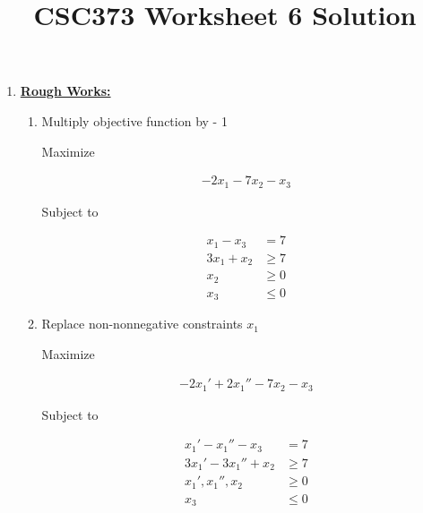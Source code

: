 \documentclass[12pt]{article}
\begin{document}
\title{CSC373 Worksheet 6 Solution}
\maketitle

\bigskip

\begin{enumerate}[1.]
    \item

    \bigskip

    \underline{\textbf{Rough Works:}}

    \begin{enumerate}[1.]
        \item Multiply objective function by - 1

        \bigskip

        \begin{mdframed}

        Maximize

        \begin{align*}
            -2x_1 - 7x_2 - x_3
        \end{align*}

        Subject to

        \begin{align*}
            x_1 - x_3  &= 7\\
            3x_1 + x_2 &\geq 7\\
            x_2 &\geq 0\\
            x_3 &\leq 0
        \end{align*}

        \end{mdframed}

        \item Replace non-nonnegative constraints $x_1$

        \begin{mdframed}

        Maximize

        \begin{align*}
            -2x_1' + 2x_1'' - 7x_2 - x_3
        \end{align*}

        Subject to

        \begin{align*}
            x_1' - x_1'' - x_3  &= 7\\
            3x_1' - 3x_1'' + x_2 &\geq 7\\
            x_1', x_1'', x_2 &\geq 0\\
            x_3 &\leq 0
        \end{align*}


\end{mdframed}
\end{enumerate}
\end{enumerate}
\end{document}
